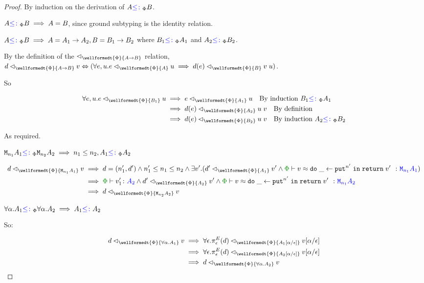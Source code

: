 \documentclass{Report}
\newcommand\eLogRel[4]{\logRel{#2}{\wellformedt{#1}{#3}}{#4}}
\newcommand\peLogRel[3]{\eLogRel{\P}{#1}{#2}{#3}}
\newcommand{\zptyperelation}[2]{\typerelation{\P}{#1}{#2}}
\newcommand{\zpberelation}[2]{\berelation{\P}{#1}{#2}}
\newcommand{\fapply}[0]{^E}
\newcommand{\pe}[0]{\pi_\e}
\begin{document}
\begin{proof}
    By induction on the derivation of $A{\color{blue} \leq\colon}_\Phi B$.

    \case{\sground}
        $A{\color{blue} \leq\colon}_\Phi B\implies A = B$, since ground subtyping is the identity relation.

    \case{\sfun}
        $A{\color{blue} \leq\colon}_\Phi B\implies A = A_1\rightarrow A_2, B = B_1\rightarrow B_2$ where $B_1{\color{blue} \leq\colon}_\Phi A_1$ and $A_2{\color{blue} \leq\colon}_\Phi B_2$.

        By the definition of the $\relates_{\wellformedt{\P}{\ab}}$ relation, $\peLogRel{d}{\ab}{v} \Leftrightarrow (\forall e, u. \peLogRel{e}{A}{u}\implies \peLogRel{d(e)}{B}{\apply{v}{u}})$.

        So 

        \begin{align*}
            \forall e, u. \peLogRel{e}{B_1}{u} & \implies \peLogRel{e}{A_1}{u} \qt{By induction $B_1\subtypep A_1$}\\
            & \implies \peLogRel{d(e)}{A_2}{\apply{u}{v}}\qt{By definition}\\
            & \implies \peLogRel{d(e)}{B_2}{\apply{u}{v}}\qt{By induction $A_2\subtypep B_2$}
        \end{align*}

        As required.
    \case{\seffect}

    $\texttt{M}_{n_1}{A_1} {\color{blue} \leq\colon}_\Phi \texttt{M}_{n_2}{A_2} \implies n_1\leq n_2, A_1{\color{blue} \leq\colon}_\Phi A_2$

    \begin{align*}
        \peLogRel{d}{\M{n_1}{A_1}}{v} & \implies  d=(n_1', d') \wedge n_1' \leq n_1\leq n_2 \wedge \exists v'. (\peLogRel{d'}{A_1}{v'} \wedge\zpberelation{v}{\doin{\_}{\put^{n'}}{\return{v'}}}{\M{n_1}{A_1}})\\
        & \implies \zptyperelation{v_1'}{A_2} \wedge \peLogRel{d'}{A_2}{v'} \wedge \zpberelation{v}{\doin{\_}{\put^{n'}}{\return{v'}}}{\M{n_1}{A_2}}\\
        & \implies \peLogRel{d}{\M{n_2}{A_2}}{v}
    \end{align*}

    \case{\squant}
    $\forall \alpha. A_1{\color{blue} \leq\colon}_\Phi \forall \alpha. A_2\implies A_1{\color{blue} \leq\colon} A_2$

    So:

    \begin{align*}
        \peLogRel{d}{\all{\a}{A_1}}{v} & \implies \peLogRel{\all{\e}{\pe\fapply(d)}}{A_1\ssub{\e}{\a}}{v\ssub{\e}{\a}}\\
        & \implies \peLogRel{\all{\e}{\pe\fapply(d)}}{A_2\ssub{\e}{\a}}{v\ssub{\e}{\a}}\\
        & \implies \peLogRel{d}{\all{\a}{A_2}}{v}
    \end{align*}
\end{proof}
\end{document}
